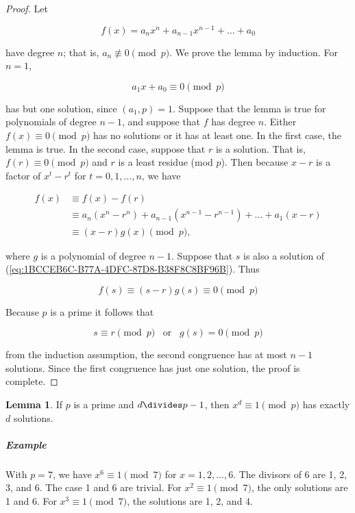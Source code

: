 \documentclass{article}
\theoremstyle{definition} %
\theoremstyle{definition}
\theoremstyle{definition}
\newtheorem{lemma}{Lemma}[section]
\theoremstyle{definition}
\begin{document}
  \begin{proof}
    Let
    
    \[ f(x) = a_nx^n + a_{n - 1}x^{n - 1}+\dots+a_0 \]
    
    have degree $n$; that is, $a_n \nequiv 0 \pmod{p}$. We prove the lemma
    by induction. For $n = 1$,
    
    \[ a_1x + a_0 \equiv 0 \pmod{p} \]
    
    has but one solution, since $(a_1, p) = 1$. Suppose that the lemma is true
    for polynomials of degree $n - 1$, and suppose that $f$ has degree $n$.
    Either $f(x) \equiv 0 \pmod{p}$ has no solutions or it has at least one. In the
    first case, the lemma is true. In the second case, suppose that $r$ is a solution.
    That is, $f(r) \equiv 0 \pmod{p}$ and $r$ is a least residue (mod $p$). Then
    because $x - r$ is a factor of $x^t - r^t$ for $t = 0, 1, \dots, n$, we have
    
    \begin{align*}
      f(x) &\equiv f(x) - f(r) \\
        &\equiv a_n(x^n - r^n) + a_{n - 1}(x^{n - 1} - r^{n - 1}) + \dots + a_1(x - r) \\
        &\equiv (x - r)g(x) \pmod{p},
    \end{align*}
    
    where $g$ is a polynomial of degree $n - 1$. Suppose that $s$ is also a solution
    of (\ref{eq:1BCCEB6C-B77A-4DFC-87D8-B38F8C8BF96B}). Thus
    
    \[ f(s) \equiv (s - r)g(s) \equiv 0 \pmod{p} \]
    
    Because $p$ is a prime it follows that
    
    \[ s \equiv r \pmod{p} \;\;\;\text{or}\;\;\; g(s) = 0 \pmod{p} \]
    
    from the induction assumption, the second congruence has at most $n - 1$ solutions.
    Since the first congruence has just one solution, the proof is complete.
  \end{proof}
  
  \begin{lemma}
    If $p$ is a prime and $d \divides p - 1$, then $x^d \equiv 1 \pmod{p}$ has exactly $d$ solutions.
  \end{lemma}
  
  \subparagraph{Example} With $p = 7$, we have $x^6 \equiv 1 \pmod{7}$ for
    $x = 1, 2, \dots, 6$. The divisors of 6 are 1, 2, 3, and 6. The case 1 and 6 are
    trivial. For $x^2 \equiv 1 \pmod{7}$, the only solutions are 1 and 6. For
    $x^3 \equiv 1 \pmod{7}$, the solutions are 1, 2, and 4.
  
\end{document}
